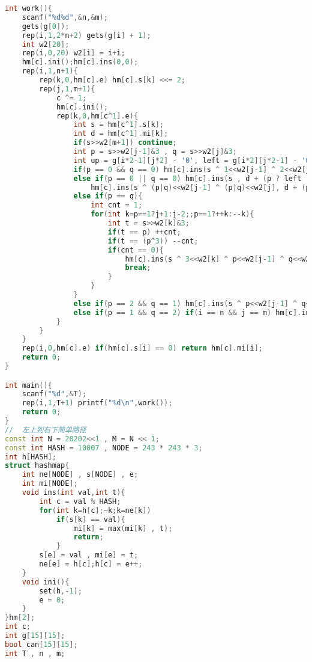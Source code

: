 \begin{lstlisting}[language=C++]
int work(){
    scanf("%d%d",&n,&m);
    gets(g[0]);
    rep(i,1,2*n+2) gets(g[i] + 1);
    int w2[20];
    rep(i,0,20) w2[i] = i+i;
    hm[c].ini();hm[c].ins(0,0);
    rep(i,1,n+1){
        rep(k,0,hm[c].e) hm[c].s[k] <<= 2;
        rep(j,1,m+1){
            c ^= 1;
            hm[c].ini();
            rep(k,0,hm[c^1].e){
                int s = hm[c^1].s[k];
                int d = hm[c^1].mi[k];
                if(s>>w2[m+1]) continue;
                int p = s>>w2[j-1]&3 , q = s>>w2[j]&3;
                int up = g[i*2-1][j*2] - '0', left = g[i*2][j*2-1] - '0';
                if(p == 0 && q == 0) hm[c].ins(s ^ 1<<w2[j-1] ^ 2<<w2[j] , d);
                else if(p == 0 || q == 0) hm[c].ins(s , d + (p ? left : up)) ,
                    hm[c].ins(s ^ (p|q)<<w2[j-1] ^ (p|q)<<w2[j], d + (p ? left : up));
                else if(p == q){
                    int cnt = 1;
                    for(int k=p==1?j+1:j-2;;p==1?++k:--k){
                        int t = s>>w2[k]&3;
                        if(t == p) ++cnt;
                        if(t == (p^3)) --cnt;
                        if(cnt == 0){
                            hm[c].ins(s ^ 3<<w2[k] ^ p<<w2[j-1] ^ q<<w2[j] , d + left + up);
                            break;
                        }
                    }
                }
                else if(p == 2 && q == 1) hm[c].ins(s ^ p<<w2[j-1] ^ q<<w2[j] , d + left + up);
                else if(p == 1 && q == 2) if(i == n && j == m) hm[c].ins(s ^ p<<w2[j-1] ^ q<<w2[j] , d + left + up);
            }
        }
    }
    rep(i,0,hm[c].e) if(hm[c].s[i] == 0) return hm[c].mi[i];
    return 0;
}

int main(){
    scanf("%d",&T);
    rep(i,1,T+1) printf("%d\n",work());
    return 0;
}
//	左上到右下简单路径
const int N = 20202<<1 , M = N << 1;
const int HASH = 10007 , NODE = 243 * 243 * 3;
int h[HASH];
struct hashmap{
    int ne[NODE] , s[NODE] , e;
    int mi[NODE];
    void ins(int val,int t){
        int c = val % HASH;
        for(int k=h[c];~k;k=ne[k])
            if(s[k] == val){
                mi[k] = max(mi[k] , t);
                return;
            }
        s[e] = val , mi[e] = t;
        ne[e] = h[c];h[c] = e++;
    }
    void ini(){
        set(h,-1);
        e = 0;
    }
}hm[2];
int c;
int g[15][15];
bool can[15][15];
int T , n , m;


\end{lstlisting}

